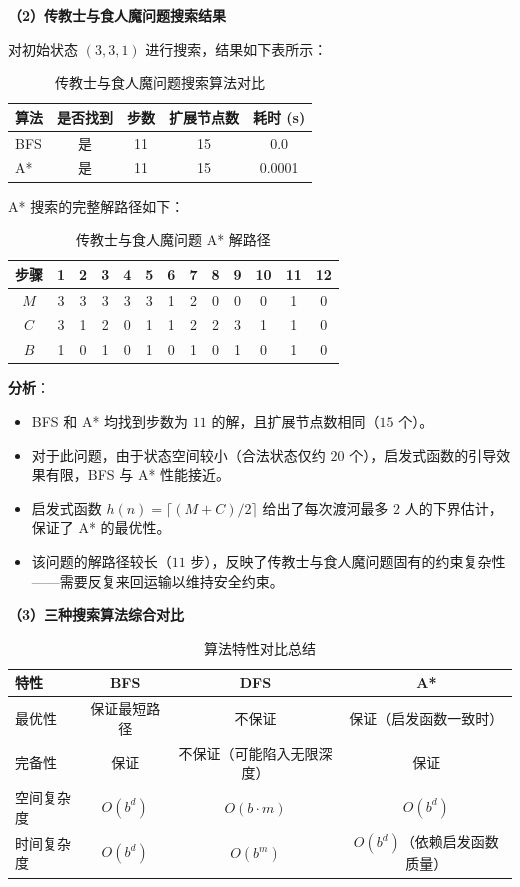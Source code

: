 \documentclass[UTF8]{ctexart}
\begin{document}
\textbf{（2）传教士与食人魔问题搜索结果}

对初始状态 $(3,3,1)$ 进行搜索，结果如下表所示：

\begin{table}[htbp]
\centering
\caption{传教士与食人魔问题搜索算法对比}
\begin{tabular}{lcccc}
\toprule
算法 & 是否找到 & 步数 & 扩展节点数 & 耗时 (s) \\
\midrule
BFS & 是 & 11 & 15 & 0.0 \\
A* & 是 & 11 & 15 & 0.0001 \\
\bottomrule
\end{tabular}
\end{table}

A* 搜索的完整解路径如下：

\begin{table}[htbp]
\centering
\caption{传教士与食人魔问题 A* 解路径}
\begin{tabular}{ccccccccccccc}
\toprule
步骤 & 1 & 2 & 3 & 4 & 5 & 6 & 7 & 8 & 9 & 10 & 11 & 12 \\
\midrule
$M$ & 3 & 3 & 3 & 3 & 3 & 1 & 2 & 0 & 0 & 0 & 1 & 0 \\
$C$ & 3 & 1 & 2 & 0 & 1 & 1 & 2 & 2 & 3 & 1 & 1 & 0 \\
$B$ & 1 & 0 & 1 & 0 & 1 & 0 & 1 & 0 & 1 & 0 & 1 & 0 \\
\bottomrule
\end{tabular}
\end{table}

\textbf{分析}：
\begin{itemize}
  \item BFS 和 A* 均找到步数为 $11$ 的解，且扩展节点数相同（$15$ 个）。
  \item 对于此问题，由于状态空间较小（合法状态仅约 $20$ 个），启发式函数的引导效果有限，BFS 与 A* 性能接近。
  \item 启发式函数 $h(n) = \lceil(M+C)/2\rceil$ 给出了每次渡河最多 $2$ 人的下界估计，保证了 A* 的最优性。
  \item 该问题的解路径较长（$11$ 步），反映了传教士与食人魔问题固有的约束复杂性——需要反复来回运输以维持安全约束。
\end{itemize}

\textbf{（3）三种搜索算法综合对比}

\begin{table}[htbp]
\centering
\caption{算法特性对比总结}
\begin{tabular}{lccc}
\toprule
特性 & BFS & DFS & A* \\
\midrule
最优性 & 保证最短路径 & 不保证 & 保证（启发函数一致时） \\
完备性 & 保证 & 不保证（可能陷入无限深度） & 保证 \\
空间复杂度 & $O(b^d)$ & $O(b \cdot m)$ & $O(b^d)$ \\
时间复杂度 & $O(b^d)$ & $O(b^m)$ & $O(b^d)$（依赖启发函数质量） \\
\bottomrule
\end{tabular}
\end{table}
\end{document}
